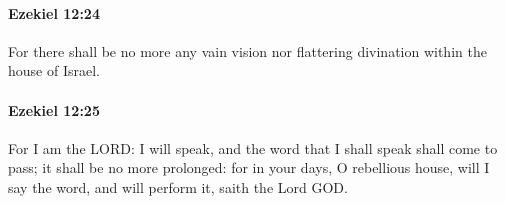 		\paragraph{Ezekiel 12:24} %
			\label{EZEKIEL-12-24}

			For there shall be no more any vain vision nor flattering divination within the house of Israel.


		\paragraph{Ezekiel 12:25} %
			\label{EZEKIEL-12-25}

			For I am the LORD: I will speak, and the word that I shall speak shall come to pass; it shall be no more prolonged: for in your days, O rebellious house, will I say the word, and will perform it, saith the Lord GOD.


